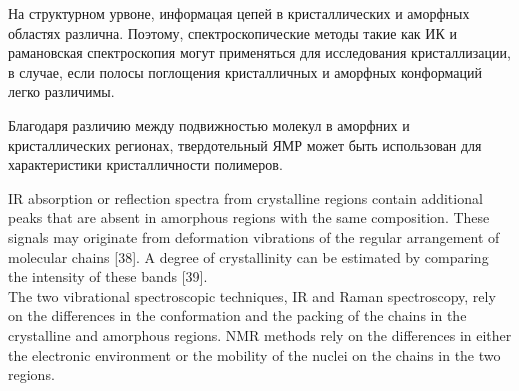 На структурном урвоне, информацая цепей в кристаллических и аморфных областях различна. Поэтому, спектроскопические методы такие как ИК и рамановская спектроскопия могут применяться для исследования кристаллизации, в случае, если полосы поглощения кристалличных и аморфных конформаций легко различимы.

Благодаря различию между подвижностью молекул в аморфних и кристаллических регионах, твердотельный ЯМР может быть использован для характеристики кристалличности полимеров.



IR absorption or reflection
spectra from crystalline regions contain additional peaks that are absent in amorphous
regions with the same composition. These signals may originate from deformation
vibrations of the regular arrangement of molecular chains [38]. A degree of crystallinity
can be estimated by comparing the intensity of these bands [39].\\

The two vibrational spectroscopic
techniques, IR and Raman spectroscopy, rely on the differences in the conformation
and the packing of the chains in the crystalline and amorphous regions. NMR
methods rely on the differences in either the electronic environment or the mobility
of the nuclei on the chains in the two regions.\\

